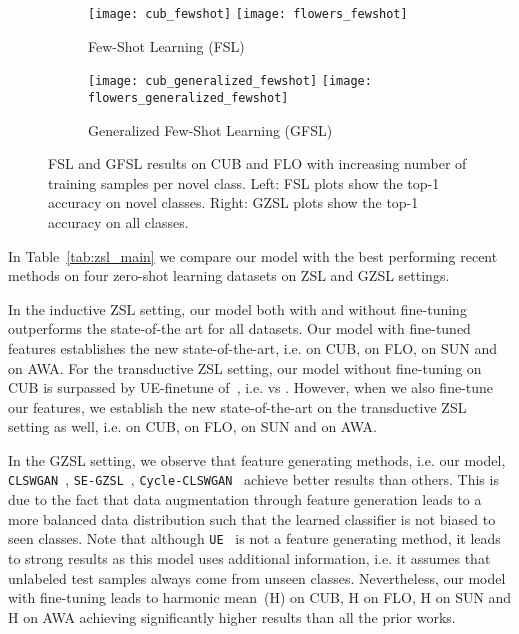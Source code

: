\documentclass[10pt,twocolumn,letterpaper]{article}
\newcommand{\myparagraph}[1]{\vspace{5pt}\noindent{\bf #1}}
\begin{document}
\begin{figure*}[t]
	\centering
    \begin{subfigure}[b]{0.49\textwidth}
        \texttt{[image: cub\_fewshot]} 
        \texttt{[image: flowers\_fewshot]} 
        \caption{Few-Shot Learning (FSL)}
        \end{subfigure}
     \begin{subfigure}[b]{0.49\textwidth}
        \texttt{[image: cub\_generalized\_fewshot]} 
        \texttt{[image: flowers\_generalized\_fewshot]} 
        \caption{Generalized Few-Shot Learning (GFSL)}
        \end{subfigure}
    	\caption{FSL and GFSL results on CUB and FLO with increasing number of training samples per novel class. Left: FSL plots show the top-1 accuracy on novel classes. Right: GZSL plots show the top-1 accuracy on all classes.} 
\label{fig:fewshot}
\end{figure*}


\myparagraph{Comparing with the state-of-the-art.} In Table~\ref{tab:zsl_main} we compare our model with the best performing recent methods on four zero-shot learning datasets on ZSL and GZSL settings. 

In the inductive ZSL setting, our model both with and without fine-tuning outperforms the state-of-the art for all datasets. Our model with fine-tuned features establishes the new state-of-the-art, i.e.  on CUB,  on FLO,  on SUN and  on AWA. For the transductive ZSL setting, our model without fine-tuning on CUB is surpassed by UE-finetune of~\cite{song2018transductive}, i.e.  vs . However, when we also fine-tune our features, we establish the new state-of-the-art on the transductive ZSL setting as well, i.e.  on CUB,  on FLO,  on SUN and  on AWA.

In the GZSL setting, we observe that feature generating methods, i.e. our model, \texttt{CLSWGAN}~\cite{XLSA18}, \texttt{SE-GZSL}~\cite{Verma_2018_CVPR}, \texttt{Cycle-CLSWGAN}~\cite{FKRC18} achieve better results than others. This is due to the fact that data augmentation through feature generation leads to a more balanced data distribution such that the learned classifier is not biased to seen classes. Note that although \texttt{UE}~\cite{song2018transductive} is not a feature generating method, it leads to strong results as this model uses additional information, i.e. it assumes that unlabeled test samples always come from unseen classes. Nevertheless, our model with fine-tuning leads to  harmonic mean~(H) on CUB,  H on FLO,  H on SUN and  H on AWA achieving significantly higher results than all the prior works.
\end{document}
